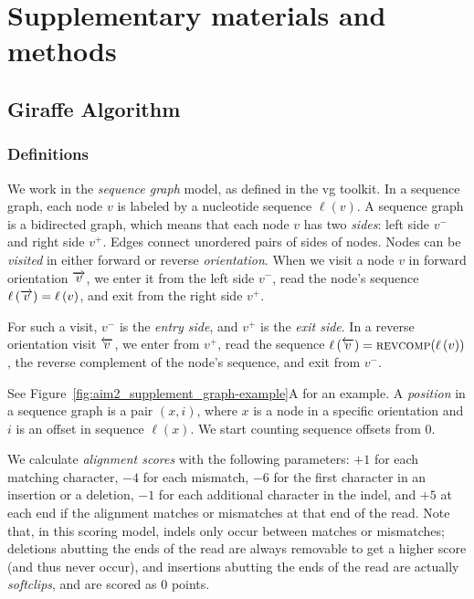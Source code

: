 \documentclass[11pt]{ucscthesis}
\newcommand{\nodelabel}[1]{\ensuremath{\ell\left( #1 \right)}}
\newcommand{\leftside}[1]{\ensuremath{{ #1 }^{-}}}
\newcommand{\rightside}[1]{\ensuremath{{ #1 }^{+}}}
\newcommand{\forwardnode}[1]{\ensuremath{\protect\overrightarrow{ #1 }}}
\newcommand{\reversenode}[1]{\ensuremath{\protect\overleftarrow{ #1 }}}
\newcommand{\reversecomplement}[1]{\ensuremath{\textsc{revcomp}({ #1 })}}
\newcommand{\vocab}[1]{\emph{#1}}
\begin{document}
\section{Supplementary materials and methods}
\subsection{Giraffe Algorithm}
\label{subsec:giraffe-methods}
\subsubsection{Definitions}

We work in the \vocab{sequence graph} model, as defined in the vg toolkit\cite{garrison_variation_2018}.
In a sequence graph, each node $v$ is labeled by a nucleotide sequence $\nodelabel{v}$.
A sequence graph is a bidirected graph, which means that each node $v$ has two \vocab{sides}: left side $\leftside{v}$ and right side $\rightside{v}$.
Edges connect unordered pairs of sides of nodes.
Nodes can be \vocab{visited} in either forward or reverse \vocab{orientation}.
When we visit a node $v$ in forward orientation $\forwardnode{v}$, we enter it from the left side $\leftside{v}$, read the node's sequence $\nodelabel{\forwardnode{v}} = \nodelabel{v}$, and exit from the right side $\rightside{v}$.

For such a visit, $\leftside{v}$ is the \vocab{entry side}, and $\rightside{v}$ is the \vocab{exit side}.
In a reverse orientation visit $\reversenode{v}$, we enter from $\rightside{v}$, read the sequence $\nodelabel{\reversenode{v}} = \reversecomplement{\nodelabel{v}}$, the reverse complement of the node's sequence, and exit from $\leftside{v}$.
\ifdefined\HCode
    \par
\fi
See Figure~\ref{fig:aim2_supplement_graph-example}A for an example.
A \vocab{position} in a sequence graph is a pair $(x, i)$, where $x$ is a node in a specific orientation and $i$ is an offset in sequence $\nodelabel{x}$.
We start counting sequence offsets from $0$.

We calculate \vocab{alignment scores} with the following parameters: $+1$ for each matching character, $-4$ for each mismatch, $-6$ for the first character in an insertion or a deletion, $-1$ for each additional character in the indel, and $+5$ at each end if the alignment matches or mismatches at that end of the read.
Note that, in this scoring model, indels only occur between matches or mismatches; deletions abutting the ends of the read are always removable to get a higher score (and thus never occur), and insertions abutting the ends of the read are actually \vocab{softclips}, and are scored as 0 points.
\end{document}
